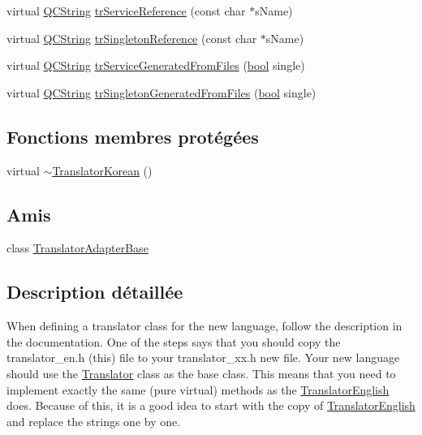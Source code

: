 \begin{DoxyCompactItemize}
\item 
virtual \hyperlink{class_q_c_string}{Q\+C\+String} \hyperlink{class_translator_korean_a2d8fa72d812093e7ef7017014bba60f2}{tr\+Service\+Reference} (const char $\ast$s\+Name)
\item 
virtual \hyperlink{class_q_c_string}{Q\+C\+String} \hyperlink{class_translator_korean_abf1bc242de55e5e8b262230baa3290cd}{tr\+Singleton\+Reference} (const char $\ast$s\+Name)
\item 
virtual \hyperlink{class_q_c_string}{Q\+C\+String} \hyperlink{class_translator_korean_aedacbfa496ebf67af407c473633a9b93}{tr\+Service\+Generated\+From\+Files} (\hyperlink{qglobal_8h_a1062901a7428fdd9c7f180f5e01ea056}{bool} single)
\item 
virtual \hyperlink{class_q_c_string}{Q\+C\+String} \hyperlink{class_translator_korean_a8e7c61f844a33dda5bd8f78e3703c939}{tr\+Singleton\+Generated\+From\+Files} (\hyperlink{qglobal_8h_a1062901a7428fdd9c7f180f5e01ea056}{bool} single)
\end{DoxyCompactItemize}
\subsection*{Fonctions membres protégées}
\begin{DoxyCompactItemize}
\item 
virtual \hyperlink{class_translator_korean_aa6bdfcaeac4371ebe4d7a99598e1cdd0}{$\sim$\+Translator\+Korean} ()
\end{DoxyCompactItemize}
\subsection*{Amis}
\begin{DoxyCompactItemize}
\item 
class \hyperlink{class_translator_korean_a6a27329ec4f8a11907f075e9052d96f7}{Translator\+Adapter\+Base}
\end{DoxyCompactItemize}


\subsection{Description détaillée}
When defining a translator class for the new language, follow the description in the documentation. One of the steps says that you should copy the translator\+\_\+en.\+h (this) file to your translator\+\_\+xx.\+h new file. Your new language should use the \hyperlink{class_translator}{Translator} class as the base class. This means that you need to implement exactly the same (pure virtual) methods as the \hyperlink{class_translator_english}{Translator\+English} does. Because of this, it is a good idea to start with the copy of \hyperlink{class_translator_english}{Translator\+English} and replace the strings one by one.

